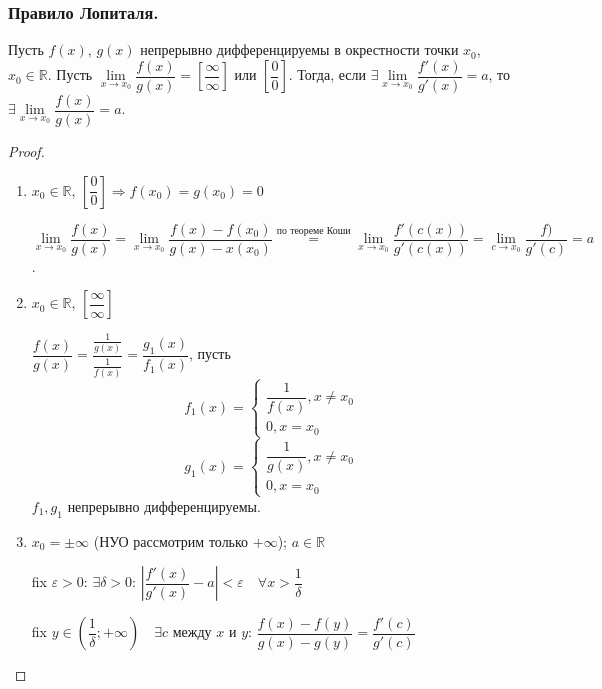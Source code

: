 \documentclass[12pt]{article}
\begin{document}
	\subsubsection{Правило Лопиталя.}
	\begin{theorem}
		Пусть $f(x)$, $g(x)$ непрерывно дифференцируемы в окрестности точки $x_0$, $x_0 \in \mathbb{R}$. Пусть $\lim\limits_{x \rightarrow x_0} \dfrac{f(x)}{g(x)} = \left[ \dfrac{\infty}{\infty} \right]$ или $\left[ \dfrac{0}{0} \right]$. Тогда, если $\exists \lim\limits_{x \rightarrow x_0} \dfrac{f'(x)}{g'(x)} = a$, то $\exists \lim\limits_{x \rightarrow x_0} \dfrac{f(x)}{g(x)} = a$.
	\end{theorem}
	\begin{proof}
		\begin{enumerate}
			\item $x_0 \in \mathbb{R}$, $\left[ \dfrac{0}{0} \right] \Rightarrow f(x_0) = g(x_0) = 0$
			
			$\lim\limits_{x \to x_0} \dfrac{f(x)}{g(x)} = \lim\limits_{x \to x_0} \dfrac{f(x) - f(x_0)}{g(x) - x(x_0)} \overset{\text{по теореме Коши}}{=} \lim\limits_{x \to x_0} \dfrac{f'(c(x))}{g'(c(x))} = \lim\limits_{c \to x_0} \dfrac{f)}{g'(c)} = a$.
			
			\item $x_0 \in \mathbb{R}$, $\left[ \dfrac{\infty}{\infty} \right]$
			
			$\dfrac{f(x)}{g(x)} = \dfrac{\frac{1}{g(x)}}{\frac{1}{f(x)}} = \dfrac{g_1(x)}{f_1(x)}$, пусть
			$$
			f_1(x) =
			\begin{cases}
				\dfrac{1}{f(x)}, x \ne x_0\\
				0, x = x_0
			\end{cases}
			$$
			$$
			g_1(x) =
			\begin{cases}
				\dfrac{1}{g(x)}, x \ne x_0\\
				0, x = x_0
			\end{cases}
			$$
			$f_1, g_1$ непрерывно дифференцируемы.
			
			\item $x_0 = \pm \infty$ (НУО рассмотрим только $+ \infty$); $a \in \mathbb{R}$
			
			fix $\varepsilon > 0$: $\exists \delta > 0$: $\left| \dfrac{f'(x)}{g'(x)} - a \right| < \varepsilon \quad \forall x > \dfrac{1}{\delta}$
			
			fix $y \in (\dfrac{1}{\delta}; + \infty) \quad \exists c$ между $x$ и $y$: $\dfrac{f(x) - f(y)}{g(x) - g(y)} = \dfrac{f'(c)}{g'(c)}$
			

\end{enumerate}
\end{proof}
\end{document}
